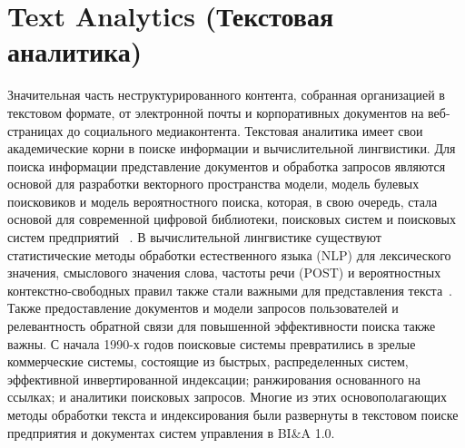 \section{Text Analytics (Текстовая аналитика)}

Значительная часть неструктурированного контента, собранная
организацией в текстовом формате, от электронной почты
и корпоративных документов на веб-страницах до социального
медиаконтента. Текстовая аналитика имеет свои академические корни в поиске информации и вычислительной лингвистики. Для
поиска информации представление документов и обработка запросов
являются основой для разработки векторного пространства
модели, модель булевых поисковиков и модель вероятностного поиска, которая, в свою очередь, стала основой для современной цифровой
библиотеки, поисковых систем и поисковых систем предприятий
~\cite{Salton:1989}. В вычислительной лингвистике существуют статистические 
методы обработки естественного языка (NLP) для лексического значения,
смыслового значения слова, частоты речи (POST)
и вероятностных контекстно-свободных правил также стали
важными для представления текста~\cite{Manning:1999}.
Также предоставление документов и модели запросов пользователей и релевантность обратной связи для
повышенной эффективности поиска также важны.
С начала 1990-х годов поисковые системы превратились в
зрелые коммерческие системы, состоящие из быстрых, распределенных
систем, эффективной инвертированной индексации; ранжирования основанного на ссылках; и аналитики поисковых запросов. Многие из этих основополагающих
методы обработки текста и индексирования были
развернуты в текстовом поиске предприятия и документах
систем управления в BI\&A 1.0.

